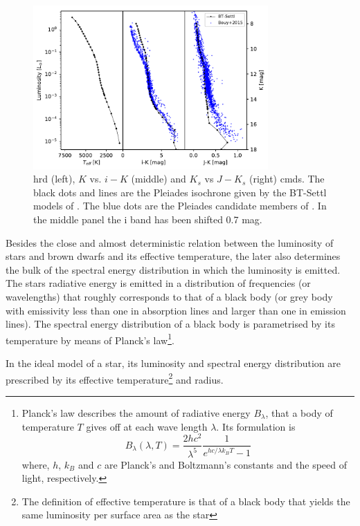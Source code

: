 \begin{figure}[htp!]
\begin{center}
\includegraphics[page=1,width=0.8\textwidth]{background/Figures/BT-Settl-2011bc-120Myr_Teff_vs_phot.pdf}
\caption{\gls{hrd} (left), $K$ vs. $i-K$ (middle) and $K_s$ vs $J-K_s$ (right) \glspl{cmd}. The black dots and lines are the Pleiades isochrone given by the BT-Settl models of \citep{2014IAUS..299..271A}. The blue dots are the Pleiades candidate members of \citet{Bouy2015}. In the middle panel the i band has been shifted 0.7 mag.}
\label{fig:HDRvsCMD}
\end{center}
\end{figure}

Besides the close and almost deterministic relation between the luminosity of stars and brown dwarfs and its effective temperature, the later also determines the bulk of the spectral energy distribution in which the luminosity is emitted. The stars radiative energy is emitted in a distribution of frequencies (or wavelengths) that roughly corresponds to that of a black body (or grey body with emissivity less than one in absorption lines and larger than one in emission lines). The spectral energy distribution of a black body is parametrised by its temperature by means of Planck's law\footnote{
Planck's law describes the amount of radiative energy $B_{\lambda}$, that a body of temperature $T$ gives off at each wave length $\lambda$. Its formulation is 
\begin{equation}
B_\lambda (\lambda,T)=\frac{2hc^2}{\lambda^5}\frac{1}{e^{h c /\lambda k_B T}-1}\nonumber
\end{equation}
where, $h$, $k_B$ and $c$ are Planck's and Boltzmann's constants and the speed of light, respectively. 
}. 

In the ideal model of a star, its luminosity and spectral energy distribution are prescribed by its effective temperature\footnote{The definition of effective temperature is that of a black body that yields the same luminosity per surface area as the star} and radius. 

